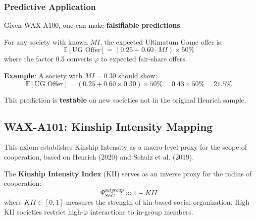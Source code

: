 \subsubsection{Predictive Application}

Given WAX-A100, one can make \textbf{falsifiable predictions}:

\begin{corollary}
For any society with known $MI$, the expected Ultimatum Game offer is:
\begin{equation}
\mathbb{E}[\text{UG Offer}] = (0.25 + 0.60 \cdot MI) \times 50\%
\end{equation}
where the factor 0.5 converts $\varphi$ to expected fair-share offers.
\end{corollary}

\textbf{Example}: A society with $MI = 0.30$ should show:
\begin{equation}
\mathbb{E}[\text{UG Offer}] = (0.25 + 0.60 \times 0.30) \times 50\% = 0.43 \times 50\% = 21.5\%
\end{equation}

This prediction is \textbf{testable} on new societies not in the original Henrich sample.




\subsection{WAX-A101: Kinship Intensity Mapping}
\label{sec:wax-a101}

This axiom establishes Kinship Intensity as a macro-level proxy for the scope of cooperation, based on Henrich (2020) and Schulz et al. (2019).

\begin{axiom}
\label{ax:kinship-intensity}
The \textbf{Kinship Intensity Index} (KII) serves as an inverse proxy for the radius of cooperation:
\begin{equation}
\Psi_{SEG}^{outgroup} \approx 1 - KII
\end{equation}
where $KII \in [0,1]$ measures the strength of kin-based social organization. High KII societies restrict high-$\varphi$ interactions to in-group members.
\end{axiom}

